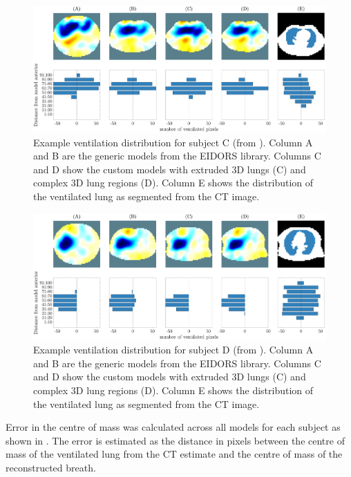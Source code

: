 \begin{figure}[H]
	\centering
	\includegraphics[width=\textwidth]{chapter5-CT_to_mesh/imgs/center_of_vent_PT04.pdf}
	\caption[Example ventilation distributions C]{\label{fig:c-of-m-results_c}%
	Example ventilation distribution for subject C (from ).
	Column A and B are the generic models from the EIDORS library. 
	Columns C and D show the custom models with extruded 3D lungs (C) and complex 3D lung regions (D).
	Column E shows the distribution of the ventilated lung as segmented from the CT image. 
	}
\end{figure}

\begin{figure}[H]
	\centering
	\includegraphics[width=\textwidth]{chapter5-CT_to_mesh/imgs/center_of_vent_PT05.pdf}
	\caption[Example ventilation distributions D]{\label{fig:c-of-m-results_d}%
	Example ventilation distribution for subject D (from ).
	Column A and B are the generic models from the EIDORS library. 
	Columns C and D show the custom models with extruded 3D lungs (C) and complex 3D lung regions (D).
	Column E shows the distribution of the ventilated lung as segmented from the CT image. 
	}
\end{figure}


Error in the centre of mass was calculated across all models for each subject 
as shown in . 
The error is estimated as the distance in pixels 
between the centre of mass of the ventilated lung from the CT estimate and the 
centre of mass of the reconstructed breath. 


